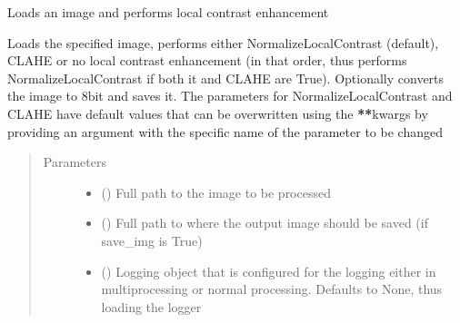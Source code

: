 \documentclass[letterpaper,10pt,english]{sphinxmanual}
\begin{document}
\begin{fulllineitems}
\begin{fulllineitems}
\end{fulllineitems}


\begin{fulllineitems}
\label{\detokenize{index:stitch_MAPS_annotations.Stitcher.local_contrast_enhancement}}
Loads an image and performs local contrast enhancement

Loads the specified image, performs either NormalizeLocalContrast (default), CLAHE or no local contrast
enhancement (in that order, thus performs NormalizeLocalContrast if both it and CLAHE are True).
Optionally converts the image to 8bit and saves it. The parameters for NormalizeLocalContrast and
CLAHE have default values that can be overwritten using the {\color{red}\bfseries{}**}kwargs by providing an argument with the specific
name of the parameter to be changed
\begin{quote}\begin{description}
\item[{Parameters}] \leavevmode\begin{itemize}
\item {} 
 () \textendash{} Full path to the image to be processed

\item {} 
 () \textendash{} Full path to where the output image should be saved (if save\_img is True)

\item {} 
 () \textendash{} Logging object that is configured for the logging either in multiprocessing or normal
processing. Defaults to None, thus loading the logger


\end{itemize}
\end{description}
\end{quote}
\end{fulllineitems}
\end{fulllineitems}
\end{document}
